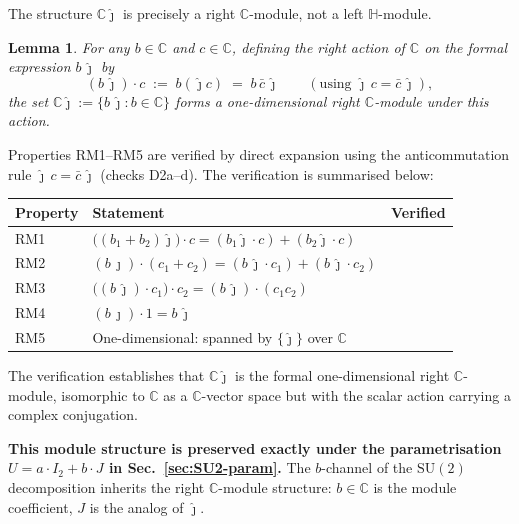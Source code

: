 \documentclass[12pt]{article}
\numberwithin{equation}{section}
\theoremstyle{plain}
\newtheorem{lemma}{Lemma}[section]
\theoremstyle{definition}
\theoremstyle{remark}
\newcommand{\su}{\mathrm{SU}}              %
\newcommand{\Cplx}{\mathbb{C}}             %
\newcommand{\HH}{\mathbb{H}}               %
\newcommand{\jhat}{\hat{\jmath}}           %
\newcommand{\Cjhat}{\Cplx\jhat}            %
\begin{document}
	The structure $\Cjhat$ is precisely a right $\Cplx$-module, not a
	left $\HH$-module.
	
	\begin{lemma}\label{lem:right-Cplx-module}
		For any $b\in\Cplx$ and $c\in\Cplx$, defining the right action of
		$\Cplx$ on the formal expression $b\,\jhat$ by
		\[
		(b\,\jhat)\cdot c \;:=\; b(\jhat c) \;=\; b\,\bar c\,\jhat
		\qquad (\text{using } \jhat\,c = \bar c\,\jhat),
		\]
		the set $\Cjhat := \{b\,\jhat : b \in \Cplx\}$ forms a one-dimensional
		right $\Cplx$-module under this action.
	\end{lemma}
	
	Properties RM1--RM5 are verified by direct expansion using the
	anticommutation rule $\jhat\,c = \bar c\,\jhat$ (checks D2a--d).
	The verification is summarised below:
	
	\begin{center}
		\small
		\setlength{\tabcolsep}{6pt}
		\begin{tabular}{@{}lll@{}}
			\toprule
			\textbf{Property} & \textbf{Statement} & \textbf{Verified}\\
			\midrule
			RM1 & $\bigl((b_1 + b_2)\jhat\bigr)\cdot c
			= (b_1\jhat\cdot c) + (b_2\jhat\cdot c)$
			& \checkmark \\[2pt]
			RM2 & $(b\,\jhat)\cdot(c_1 + c_2)
			= (b\,\jhat\cdot c_1) + (b\,\jhat\cdot c_2)$
			& \checkmark \\[2pt]
			RM3 & $\bigl((b\,\jhat)\cdot c_1\bigr)\cdot c_2
			= (b\,\jhat)\cdot(c_1 c_2)$
			& \checkmark \\[2pt]
			RM4 & $(b\,\jhat)\cdot 1 = b\,\jhat$
			& \checkmark \\[2pt]
			RM5 & One-dimensional: spanned by $\{\jhat\}$ over $\Cplx$
			& \checkmark \\
			\bottomrule
		\end{tabular}
	\end{center}
	
	\noindent
	The verification establishes that $\Cjhat$ is the formal
	one-dimensional right $\Cplx$-module, isomorphic to $\Cplx$ as a
	$\Cplx$-vector space but with the scalar action carrying a complex
	conjugation.
	
	\medskip\noindent
	\textbf{This module structure is preserved exactly under the
		parametrisation $U = a\cdot I_2 + b\cdot J$ in
		Sec.~\ref{sec:SU2-param}.}  The $b$-channel of the $\su(2)$
	decomposition inherits the right $\Cplx$-module structure: $b\in\Cplx$
	is the module coefficient, $J$ is the analog of $\jhat$.
	
\end{document}
